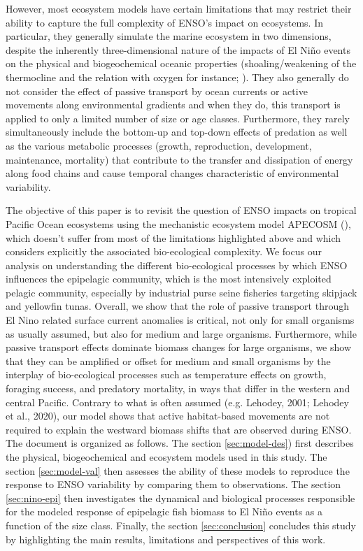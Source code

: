 However, most ecosystem models have certain limitations that may restrict their ability to capture the full complexity of ENSO's impact on ecosystems. In particular, they generally simulate the marine ecosystem in two dimensions, despite the  inherently three-dimensional nature of the impacts of El Niño events on the physical and biogeochemical oceanic properties  (shoaling/weakening of the thermocline and the relation with oxygen for instance; \citealp{leungENSODrivesNearsurface2019}). They also generally do not consider the effect of passive transport by ocean currents or active movements along environmental gradients and when they do, this transport is applied  to only a limited number of size or age classes. Furthermore, they rarely simultaneously include  the bottom-up and top-down effects of predation as well as the various metabolic processes (growth, reproduction, development, maintenance, mortality) that contribute to the transfer and dissipation of energy along food chains and cause temporal changes characteristic of environmental variability. 

The objective of this paper is to revisit the question of ENSO impacts on tropical Pacific Ocean ecosystems using the mechanistic ecosystem model APECOSM (\citealp{mauryOverviewAPECOSMSpatialized2010}), which doesn't suffer from most of the limitations highlighted above and which considers explicitly the associated bio-ecological complexity. We focus our analysis on understanding the different bio-ecological processes by which ENSO influences the epipelagic community, which is  the most intensively exploited pelagic community, especially by industrial purse seine fisheries targeting skipjack and yellowfin tunas. Overall, we show that the role of passive transport through El Nino related surface current anomalies is critical, not only for small organisms as usually assumed, but also for medium and large organisms. Furthermore, while passive transport effects dominate biomass changes for large organisms, we show that they can be amplified or offset for medium and small organisms by the interplay of bio-ecological processes such as temperature effects on growth, foraging success, and predatory mortality, in ways that differ in the western and central Pacific. Contrary to what is often assumed (e.g. Lehodey, 2001; Lehodey et al., 2020), our model shows that active habitat-based movements are not required to explain the westward biomass shifts that are observed during ENSO.
The document is organized as follows. The section \ref{sec:model-des}) first describes the physical, biogeochemical and ecosystem models used in this study. The section \ref{sec:model-val} then assesses the ability of these models to reproduce the response to ENSO variability by comparing them to observations. The section \ref{sec:nino-epi} then investigates the dynamical and biological processes responsible for the modeled response of epipelagic fish biomass to El Niño events as a function of the size class. Finally, the section \ref{sec:conclusion} concludes this study by highlighting the main results, limitations and perspectives of this work. 

